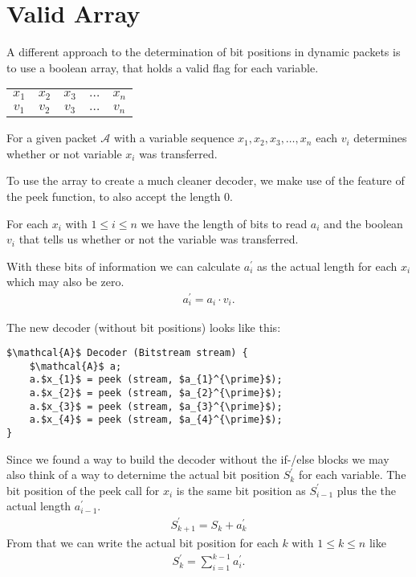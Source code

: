\documentclass[parskip=half,paper=a4,DIV=13]{scrartcl}
\begin{document}
\section{Valid Array}

A different approach to the determination of bit positions in dynamic packets is to use
a boolean array, that holds a valid flag for each variable.
\begin{center}
\begin{tabular}{ccccc}
	$x_{1}$ &$x_{2}$ &$x_{3}$ &$\ldots$ &$x_{n}$\\
	$v_{1}$ &$v_{2}$ &$v_{3}$ &$\ldots$ &$v_{n}$	
\end{tabular}
\end{center}

For a given packet $\mathcal{A}$ with a variable sequence $x_{1}, x_{2}, x_{3}, \ldots , x_{n}$
each $v_{i}$ determines whether or not variable $x_{i}$ was transferred.

To use the array to create a much cleaner decoder, we make use of the feature of the
peek function, to also accept the length 0.

For each $x_{i}$ with $1\leq i\leq n$ we have the length of bits to read $a_{i}$
and the boolean $v_{i}$ that tells us whether or not the variable was transferred.

With these bits of information we can calculate  $a_{i}^{\prime}$ as the actual length
for each $x_{i}$ which may also be zero.
\begin{align*}
	a_{i}^{\prime} = a_{i} \cdot v_{i}.
\end{align*}

The new decoder (without bit positions) looks like this:
\begin{lstlisting}[mathescape]
$\mathcal{A}$ Decoder (Bitstream stream) {
	$\mathcal{A}$ a;
	a.$x_{1}$ = peek (stream, $a_{1}^{\prime}$);
	a.$x_{2}$ = peek (stream, $a_{2}^{\prime}$);
	a.$x_{3}$ = peek (stream, $a_{3}^{\prime}$);
	a.$x_{4}$ = peek (stream, $a_{4}^{\prime}$);
}
\end{lstlisting}

Since we found a way to build the decoder without the if-/else blocks
we may also think of a way to deternime the actual bit position $S_{k}^{\prime}$ for each variable.
The bit position of the peek call for $x_{i}$ is the same bit position as $S_{i-1}^{\prime}$ plus the the actual length $a_{i-1}^{\prime}$.
\begin{align*}
	S_{k+1}^{\prime} = S_{k} + a_{k}^{\prime}
\end{align*}
From that we can write the actual bit position for each $k$ with $1 \leq k \leq n$ like
\begin{align*}
	S_{k}^{\prime} = \sum_{i=1}^{k-1} a_{i}^{\prime}.
\end{align*}
\end{document}
